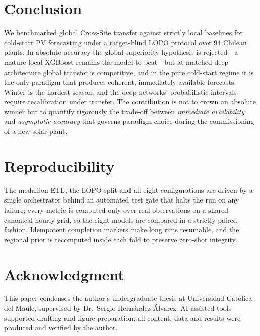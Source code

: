 \documentclass[conference]{IEEEtran}
\begin{document}
\section{Conclusion}
We benchmarked global Cross-Site transfer against strictly local baselines for cold-start PV
forecasting under a target-blind LOPO protocol over 94 Chilean plants. In absolute accuracy
the global-superiority hypothesis is rejected---a mature local XGBoost remains the model to
beat---but at matched deep architecture global transfer is competitive, and in the pure
cold-start regime it is the only paradigm that produces coherent, immediately available
forecasts. Winter is the hardest season, and the deep networks' probabilistic intervals
require recalibration under transfer. The contribution is not to crown an absolute winner but
to quantify rigorously the trade-off between \emph{immediate availability} and
\emph{asymptotic accuracy} that governs paradigm choice during the commissioning of a new
solar plant.

\section*{Reproducibility}
The medallion ETL, the LOPO split and all eight configurations are driven by a single
orchestrator behind an automated test gate that halts the run on any failure; every metric is
computed only over real observations on a shared canonical hourly grid, so the eight models
are compared in a strictly paired fashion. Idempotent completion markers make long runs
resumable, and the regional prior is recomputed inside each fold to preserve zero-shot
integrity.

\section*{Acknowledgment}
This paper condenses the author's undergraduate thesis at Universidad Cat\'olica del Maule,
supervised by Dr.\ Sergio Hern\'andez \'Alvarez. AI-assisted tools supported drafting and
figure preparation; all content, data and results were produced and verified by the author.

\balance


\end{document}
